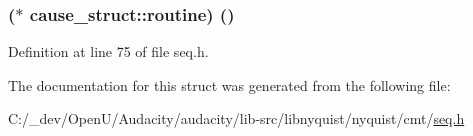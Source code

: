 \subsubsection[{\texorpdfstring{routine}{routine}}]{($\ast$ cause\+\_\+struct\+::routine) ()}\hypertarget{structcause__struct_a32140552b697d652a19f4074bf94d23e}{}\label{structcause__struct_a32140552b697d652a19f4074bf94d23e}


Definition at line 75 of file seq.\+h.



The documentation for this struct was generated from the following file\+:\begin{DoxyCompactItemize}
\item 
C\+:/\+\_\+dev/\+Open\+U/\+Audacity/audacity/lib-\/src/libnyquist/nyquist/cmt/\hyperlink{seq_8h}{seq.\+h}\end{DoxyCompactItemize}
